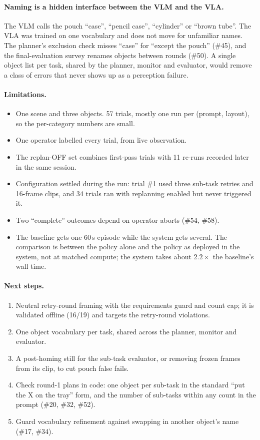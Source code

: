 \paragraph{Naming is a hidden interface between the VLM and the VLA.} The VLM calls the
pouch ``case'', ``pencil case'', ``cylinder'' or ``brown tube''. The VLA was trained on one
vocabulary and does not move for unfamiliar names. The planner's exclusion check misses
``case'' for ``except the pouch'' (\#45), and the final-evaluation survey renames objects
between rounds (\#50). A single object list per task, shared by the planner, monitor and
evaluator, would remove a class of errors that never shows up as a perception failure.

\paragraph{Limitations.}
\begin{itemize}
  \item One scene and three objects. 57 trials, mostly one run per (prompt, layout), so
    the per-category numbers are small.
  \item One operator labelled every trial, from live observation.
  \item The replan-OFF set combines first-pass trials with 11 re-runs recorded later in
    the same session.
  \item Configuration settled during the run: trial \#1 used three sub-task retries and
    16-frame clips, and 34 trials ran with replanning enabled but never triggered it.
  \item Two ``complete'' outcomes depend on operator aborts (\#54, \#58).
  \item The baseline gets one 60\,s episode while the system gets several. The comparison
    is between the policy alone and the policy as deployed in the system, not at matched
    compute; the system takes about $2.2\times$ the baseline's wall time.
\end{itemize}

\paragraph{Next steps.}
\begin{enumerate}
  \item Neutral retry-round framing with the requirements guard and count cap; it is
    validated offline (16/19) and targets the retry-round violations.
  \item One object vocabulary per task, shared across the planner, monitor and evaluator.
  \item A post-homing still for the sub-task evaluator, or removing frozen frames from its
    clip, to cut pouch false fails.
  \item Check round-1 plans in code: one object per sub-task in the standard ``put the X on
    the tray'' form, and the number of sub-tasks within any count in the prompt (\#20,
    \#32, \#52).
  \item Guard vocabulary refinement against swapping in another object's name (\#17,
    \#34).
\end{enumerate}
